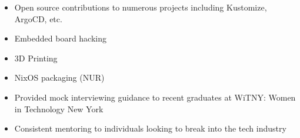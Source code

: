 \documentclass[9pt]{developercv}
\begin{document}
\begin{minipage}[t]{0.4\textwidth}
	\vspace{-\baselineskip} %
	

	\begin{itemize}
		\item Open source contributions to numerous projects including Kustomize, ArgoCD, etc.
		\item Embedded board hacking
		\item 3D Printing
		\item NixOS packaging (NUR)
	\end{itemize}
\end{minipage}
\begin{minipage}[t]{0.5\textwidth}
	\vspace{-\baselineskip} %
	

	\begin{itemize}
		\item Provided mock interviewing guidance to recent graduates at WiTNY: Women in Technology New York
		\item Consistent mentoring to individuals looking to break into the tech industry
	\end{itemize}
\end{minipage}

\end{document}
